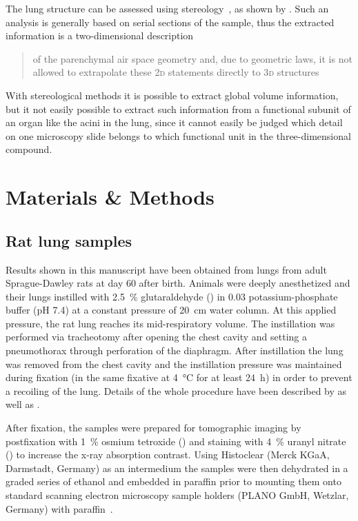 \documentclass[%
	paper=a4,%
	DIV=calc,%
	twoside=true,%
	abstract=true,%
	]{scrartcl}
\newcommand{\twod}{2\textsc{d}\xspace}
\newcommand{\threed}{3\textsc{d}\xspace}
\begin{document}
The lung structure can be assessed using stereology~\cite{Hsia2010}, as shown by \citet{Tschanz2002}. Such an analysis is generally based on serial sections of the sample, thus the extracted information is a two-dimensional description \blockquote[\cite{Tschanz2002}]{of the parenchymal air space geometry and, due to geometric laws, it is not allowed to extrapolate these \twod statements directly to \threed structures}. With stereological methods it is possible to extract global volume information, but it not easily possible to extract such information from a functional subunit of an organ like the acini in the lung, since it cannot easily be judged which detail on one microscopy slide belongs to which functional unit in the three-dimensional compound.

\section{Materials \& Methods\label{sec:MM}}
\subsection{Rat lung samples}
Results shown in this manuscript have been obtained from lungs from adult Sprague-Dawley rats at day 60 after birth. Animals were deeply anesthetized and their lungs instilled with \SI{2.5}{\percent} glutaraldehyde () in \SI{0.03}{\Molar} potassium-phosphate buffer (pH 7.4) at a constant pressure of \SI{20}{\centi\meter} water column. At this applied pressure, the rat lung reaches its mid-respiratory volume. The instillation was performed via tracheotomy after opening the chest cavity and setting a pneumothorax through perforation of the diaphragm. After instillation the lung was removed from the chest cavity and the instillation pressure was maintained during fixation (in the same fixative at \SI{4}{\celsius} for at least \SI{24}{\hour}) in order to prevent a recoiling of the lung. Details of the whole procedure have been described by \citet{Tschanz2002} as well as \citet{Burri1974}.

After fixation, the samples were prepared for tomographic imaging by postfixation with \SI{1}{\percent} osmium tetroxide () and staining with \SI{4}{\percent} uranyl nitrate () to increase the x-ray absorption contrast. Using Histoclear (Merck KGaA, Darmstadt, Germany) as an intermedium the samples were then dehydrated in a graded series of ethanol and embedded in paraffin prior to mounting them onto standard scanning electron microscopy sample holders (PLANO GmbH, Wetzlar, Germany) with paraffin~\cite{Tsuda2008}.
\end{document}
